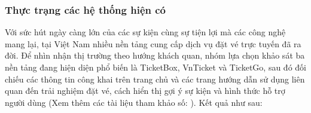 \subsubsection{Thực trạng các hệ thống hiện có}
\indent \indent Với sức hút ngày càng lớn của các sự kiện cùng sự tiện lợi mà các công nghệ mang lại, tại Việt Nam nhiều nền tảng cung cấp dịch vụ đặt vé trực tuyến đã ra đời. 
Để nhìn nhận thị trường theo hướng khách quan, nhóm lựa chọn khảo sát ba nền tảng đang hiện diện phổ biến là TicketBox, VnTicket và TicketGo, sau đó đối chiếu các thông tin công khai trên trang chủ và các trang hướng dẫn sử dụng liên quan đến trải nghiệm đặt vé, cách hiển thị gợi ý sự kiện và hình thức hỗ trợ người dùng (Xem thêm các tài liệu tham khảo số: \cite{ticketbox_home,ticketbox_payment_methods,ticketbox_customer_terms,ticketgo_home,ticketgo_booking_guide,vnticket_home}). 
Kết quả như sau:

